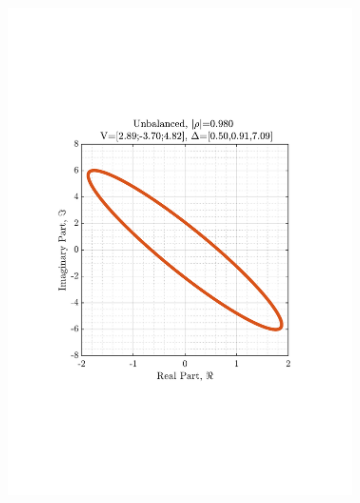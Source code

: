 \documentclass[12pt]{article}
\numberwithin{equation}{section}
\begin{document}
\begin{figure}[H]
\begin{subfigure}{0.45\textwidth}
					\includegraphics[trim={2.2cm 6.8cm 3.00cm  6.2cm}, clip, width=\textwidth]{../MATLAB/figures/q3_1c_fig02.pdf} 
					\captionsetup{justification=centering}
				\end{subfigure}
			

\end{figure}
\end{document}
